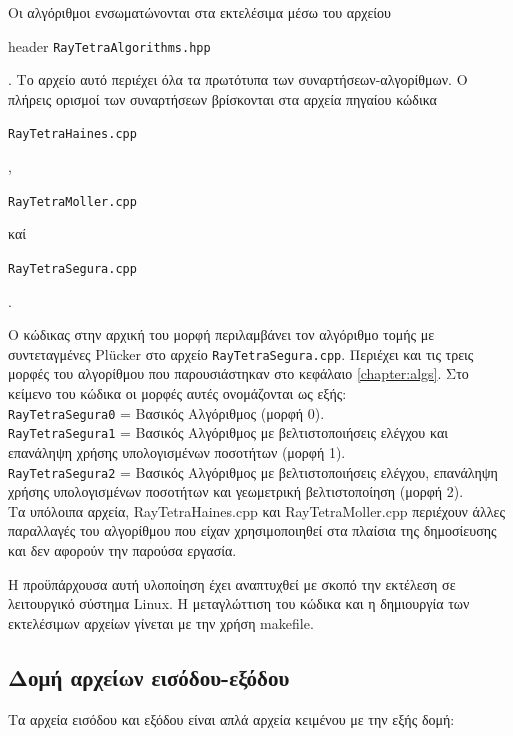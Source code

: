 Οι αλγόριθμοι ενσωματώνονται στα εκτελέσιμα μέσω του αρχείου \begin{english}header \verb!RayTetraAlgorithms.hpp!\end{english}. Το αρχείο αυτό περιέχει όλα τα πρωτότυπα των συναρτήσεων-αλγορίθμων. Ο πλήρεις ορισμοί των συναρτήσεων βρίσκονται στα αρχεία πηγαίου κώδικα \begin{english}\verb!RayTetraHaines.cpp!\end{english}, \begin{english}\verb!RayTetraMoller.cpp!\end{english} καί \begin{english}\verb!RayTetraSegura.cpp!\end{english}.

Ο κώδικας στην αρχική του μορφή περιλαμβάνει τον αλγόριθμο τομής με συντεταγμένες Plücker στο αρχείο \verb!RayTetraSegura.cpp!. Περιέχει και τις τρεις μορφές του αλγορίθμου που παρουσιάστηκαν στο κεφάλαιο \ref{chapter:algs}. Στο κείμενο του κώδικα οι μορφές αυτές ονομάζονται ως εξής:\\

\noindent \verb!RayTetraSegura0! = Βασικός Αλγόριθμος (μορφή 0).\\
\verb!RayTetraSegura1! = Βασικός Αλγόριθμος με βελτιστοποιήσεις ελέγχου και επανάληψη χρήσης υπολογισμένων ποσοτήτων (μορφή 1).\\
\verb!RayTetraSegura2! = Βασικός Αλγόριθμος με βελτιστοποιήσεις ελέγχου, επανάληψη χρήσης υπολογισμένων ποσοτήτων και γεωμετρική βελτιστοποίηση (μορφή 2).\\
Τα υπόλοιπα αρχεία, RayTetraHaines.cpp και RayTetraMoller.cpp περιέχουν άλλες παραλλαγές του αλγορίθμου που είχαν χρησιμοποιηθεί στα πλαίσια της δημοσίευσης και δεν αφορούν την παρούσα εργασία.

Η προϋπάρχουσα αυτή υλοποίηση έχει αναπτυχθεί με σκοπό την εκτέλεση σε λειτουργικό σύστημα Linux. Η μεταγλώττιση του κώδικα και η δημιουργία των εκτελέσιμων αρχείων γίνεται με την χρήση makefile.

\subsection{Δομή αρχείων εισόδου-εξόδου}
\noindent Τα αρχεία εισόδου και εξόδου είναι απλά αρχεία κειμένου με την εξής δομή:

